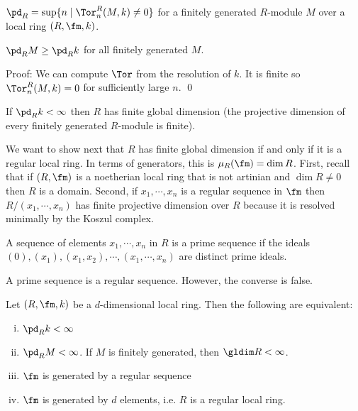 \begin{rem}
$\pd_R=\sup\{n\;|\; \Tor_n^R(M,k) \neq 0\}$ for a finitely generated $R$-module $M$ over a local ring $(R,\fm,k)$.
\end{rem}

\begin{cor}
$\pd_R M \geq \pd_R k$ for all finitely generated $M$.
\end{cor}

\noindent Proof: We can compute $\Tor$ from the resolution of $k$. It is finite so $\Tor_n^R(M,k)=0$ for sufficiently large $n$. \qed \\

\begin{cor}
If $\pd_R k<\infty$ then $R$ has finite global dimension (the projective dimension of every finitely generated $R$-module is finite).
\end{cor}

We want to show next that $R$ has finite global dimension if and only if it is a regular local ring. In terms of generators, this is $\mu_R(\fm)=\dim R$. First, recall that if $(R,\fm)$ is a noetherian local ring that is not artinian and $\dim R \neq 0$ then $R$ is a domain. Second, if $x_1,\cdots,x_n$ is a regular sequence in $\fm$ then $R/(x_1,\cdots,x_n)$ has finite projective dimension over $R$ because it is resolved minimally by the Koszul complex.

\begin{dfn}
A sequence of elements $x_1,\cdots,x_n$ in $R$ is a prime sequence if the ideals $(0),(x_1),(x_1,x_2),\cdots,(x_1,\cdots,x_n)$ are distinct prime ideals. 
\end{dfn}

\begin{rem}
A prime sequence is a regular sequence. However, the converse is false. 
\end{rem}

\begin{thmm}
Let $(R,\fm,k)$ be a $d$-dimensional local ring. Then the following are equivalent:
\begin{enumerate}[(i)]
\item $\pd_R k<\infty$
\item $\pd_R M<\infty$. If $M$ is finitely generated, then $\gldim R<\infty$.
\item $\fm$ is generated by a regular sequence
\item $\fm$ is generated by $d$ elements, i.e. $R$ is a regular local ring.
\end{enumerate}
\end{thmm}


